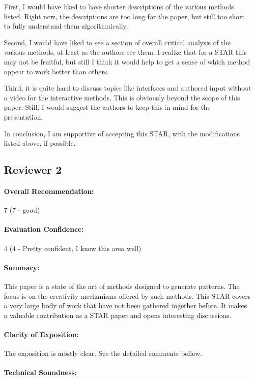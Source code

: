 \documentclass{egpubl}
\newcommand{\rev}[2]{{\color{greenrev}\textsuperscript{#1}#2}}
\renewcommand{\rev}[2]{{#2}}
\begin{document}
First, I would have liked to have shorter descriptions of the various methods listed. Right now, the descriptions are too long for the paper, but still too short to fully understand them algorithmically.

Second, I would have liked to see a section of overall critical analysis of the various methods, at least as the authors see them. I realize that for a STAR this may not be fruitful, but still I think it would help to get a sense of which method appear to work better than others.

Third, it is quite hard to discuss topics like interfaces and authored input without a video for the interactive methods. This is obviously beyond the scope of this paper. Still, I would suggest the authors to keep this in mind for the presentation.

In conclusion, I am supportive of accepting this STAR, with the modifications listed above, if possible.


\rev{Comments}{}

\subsection*{Reviewer 2}

\paragraph*{Overall Recommendation:} 7 (7 - good)
\paragraph*{Evaluation Confidence:} 4 (4 - Pretty confident, I know this area well)
\paragraph*{Summary:} This paper is a state of the art of methods designed to generate patterns. The focus is on the creativity mechanisms offered by such methods.
This STAR covers a very large body of work that have not been gathered together before. It makes a valuable contribution as a STAR paper and opens interesting discussions. 
\paragraph*{Clarity of Exposition:} The exposition is mostly clear. See the detailed comments bellow.
\paragraph*{Technical Soundness:} 
\end{document}
